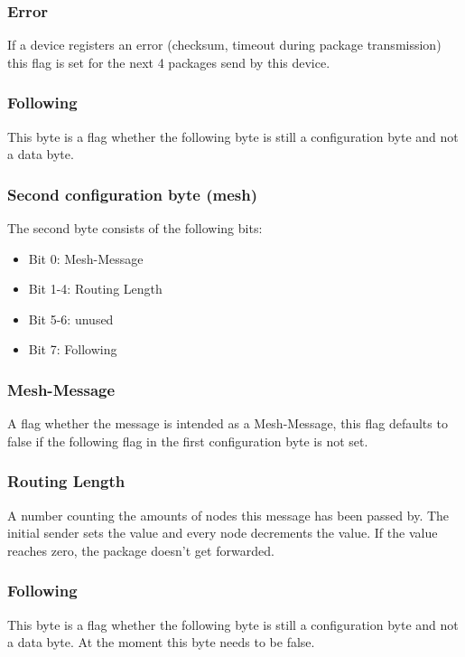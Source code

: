 \documentclass{report}
\begin{document}
    \subsubsection{Error}
     If a device registers an error (checksum, timeout during package
     transmission) this flag is set for the next 4 packages send by this device.

    \subsubsection{Following}
     This byte is a flag whether the following byte is still a configuration
     byte and not a data byte.

    \subsubsection{Second configuration byte (mesh)}
     The second byte consists of the following bits:
     \begin{itemize}
         \item Bit 0: Mesh-Message
         \item Bit 1-4: Routing Length
         \item Bit 5-6: unused
         \item Bit 7: Following
     \end{itemize}

    \subsubsection{Mesh-Message}
     A flag whether the message is intended as a Mesh-Message, this flag
     defaults to false if the following flag in the first configuration byte is
     not set.

    \subsubsection{Routing Length}
     A number counting the amounts of nodes this message has been passed by. The
     initial sender sets the value and every node decrements the value. If the
     value reaches zero, the package doesn't get forwarded.

    \subsubsection{Following}
     This byte is a flag whether the following byte is still a configuration
     byte and not a data byte. At the moment this byte needs to be false.
\end{document}
